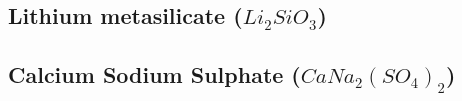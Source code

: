 \documentclass[../../Report.tex]{subfiles}
\begin{document}
    \subsection{\large Lithium metasilicate ($Li_2SiO_3$)}
        
    \newpage
    \subsection{\large Calcium Sodium Sulphate ($CaNa_2{(SO_4)}_2$)}
        
\end{document}
